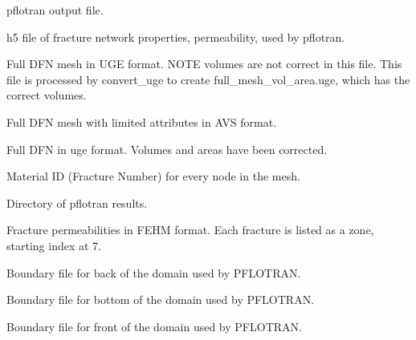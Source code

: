\documentclass[letterpaper,10pt,english]{sphinxmanual}
\begin{document}

\label{\detokenize{output:dfn-explicit-out}}
pflotran output file.


\label{\detokenize{output:dfn-properties-h5}}
h5 file of fracture network properties, permeability, used by pflotran.


\label{\detokenize{output:full-mesh-uge}}
Full DFN mesh in UGE format. NOTE volumes are not correct in this file. This file is processed by convert\_uge to create full\_mesh\_vol\_area.uge, which has the correct volumes.


\label{\detokenize{output:full-mesh-viz-inp}}
Full DFN mesh with limited attributes in AVS format.


\label{\detokenize{output:full-mesh-vol-area-uge}}
Full DFN in uge format. Volumes and areas have been corrected.


\label{\detokenize{output:materialid-dat}}
Material ID (Fracture Number) for every node in the mesh.


\label{\detokenize{output:parsed-vtk}}
Directory of pflotran results.


\label{\detokenize{output:perm-dat}}
Fracture permeabilities in FEHM format. Each fracture is listed as a zone, starting index at 7.


\label{\detokenize{output:pboundary-back-n-ex}}
Boundary file for back of the domain used by PFLOTRAN.


\label{\detokenize{output:pboundary-bottom-ex}}
Boundary file for bottom of the domain used by PFLOTRAN.


\label{\detokenize{output:pboundary-front-s-ex}}
Boundary file for front of the domain used by PFLOTRAN.
\end{document}
